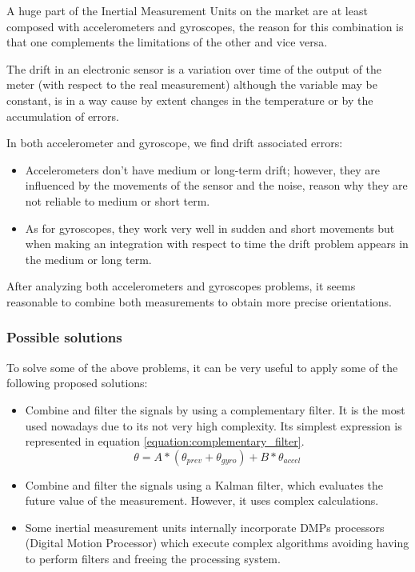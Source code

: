 A huge part of the Inertial Measurement Units on the market are at least composed with accelerometers and gyroscopes, the reason for this combination is that one complements the limitations of the other and vice versa. \newline

The drift in an electronic sensor is a variation over time of the output of the meter (with respect to the real measurement) although the variable may be constant, is in a way cause by extent changes in the temperature or by the accumulation of errors. \newline

In both accelerometer and gyroscope, we find drift associated errors: 
\begin{itemize}
	\item Accelerometers don’t have medium or long-term drift; however, they are influenced by the movements of the sensor and the noise, reason why they are not reliable to medium or short term.
	\item As for gyroscopes, they work very well in sudden and short movements but when making an integration with respect to time the drift problem appears in the medium or long term.
\end{itemize} 

After analyzing both accelerometers and gyroscopes problems, it seems reasonable to combine both measurements to obtain more precise orientations.

\subsubsection{Possible solutions}

To solve some of the above problems, it can be very useful to apply some of the following proposed solutions: 

\begin{itemize}
	\item Combine and filter the signals by using a complementary filter. It is the most used nowadays due to its not very high complexity. Its simplest expression is represented in equation \ref{equation:complementary_filter}.
	\begin{equation} \label{equation:complementary_filter}
	\theta = A * (\theta_{prev}+\theta_{gyro}) + B * \theta_{accel}
	\end{equation}
	\item Combine and filter the signals using a Kalman filter, which evaluates the future value of the measurement. However, it uses complex calculations. 
	\item Some inertial measurement units internally incorporate DMPs processors (Digital Motion Processor) which execute complex algorithms avoiding having to perform filters and freeing the processing system.
\end{itemize}

